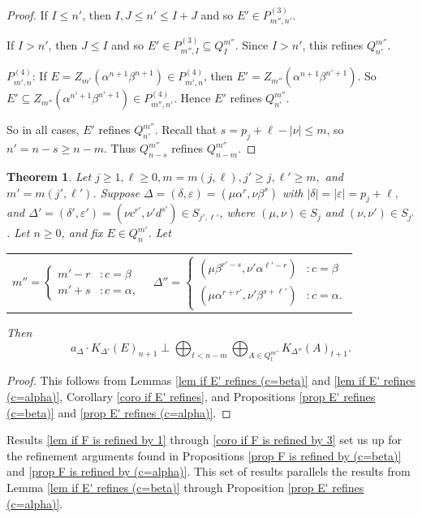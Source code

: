 \documentclass[12pt]{amsart}
\newcommand{\sse}{\subseteq}
\newcommand{\al}{\alpha}
\newcommand{\be}{\beta}
\newcommand{\de}{\delta}
\newcommand{\De}{\Delta}
\newcommand{\ep}{\varepsilon}
\theoremstyle{plain} %
\newtheorem{Theorem}{Theorem}[section]
\theoremstyle{definition} %
\begin{document}
\begin{proof}
    If $I \leq n'$, then $I, J \leq n' \leq I+J$ and so $E' \in P_{m'',n'}^{(3)}$.

    If $I > n'$, then $J \leq I$ and so $E' \in P^{(3)}_{m'',I} \sse Q_I^{m''}$. Since $I > n'$, this refines $Q_{n'}^{m''}$.

    $P^{(4)}_{m',n}$: If $E = Z_{m'}(\al^{n+1}\be^{n+1})\in P_{m',n}^{(4)}$, then $E' = Z_{m''}(\al^{n+1} \be^{n'+1})$. So $E' \sse Z_{m''}(\al^{n'+1}\be^{n'+1}) \in P_{m'',n'}^{(4)}$. Hence $E'$ refines $Q_{n'}^{m''}$.

    So in all cases, $E'$ refines $Q_{n'}^{m''}$. Recall that $s = p_j + \ell - |\nu| \leq m$, so $n'= n-s \geq n-m$. Thus $Q_{n-s}^{m''}$ refines $Q_{n-m}^{m''}$.
\end{proof}

\begin{Theorem}\label{thm a acts on K 2}
Let $j \geq 1, \ell \geq 0, m = m(j,\ell), j' \geq j, \ell' \ge m,$ and $m' = m(j', \ell')$. Suppose $\De = (\de, \ep) = (\mu\al^r, \nu\be^s) $ with $|\de| = |\ep| = p_j + \ell,$ and $\De' =(\de', \ep') = (\nu c^{r'}, \nu'd^{s'}) \in S_{j', \ell'}$, where $(\mu,\nu) \in S_j$ and $(\nu,\nu') \in S_{j'}$. Let $n \geq 0$, and fix $E \in Q_n^{m'}$. Let

    \begin{tabular}{l l}
    $m'' = \begin{cases}
        m'-r &: c=\be\\m'+s &: c=\al,
    \end{cases}$
    & $\De'' = \begin{cases}
        (\mu \be^{r'-s}, \nu'\al^{\ell'-r}) &: c=\be\\ (\mu\al^{r+r'}, \nu'\be^{s+\ell'}) &: c=\al.
    \end{cases}$\\
\end{tabular}

Then \[ a_{\De} \cdot K_{\De'}(E)_{n+1} \perp \bigoplus_{t < n-m} \bigoplus_{A \in Q_{t}^{m''}} K_{\De''}(A)_{t+1}.\]
\end{Theorem}
\begin{proof}
    This follows from Lemmas \ref{lem if E' refines (c=beta)} and \ref{lem if E' refines (c=alpha)}, Corollary \ref{coro if E' refines}, and Propositions \ref{prop E' refines (c=beta)} and \ref{prop E' refines (c=alpha)}.
\end{proof}

Results \ref{lem if F is refined by 1} through \ref{coro if F is refined by 3} set us up for the refinement arguments found in Propositions \ref{prop F is refined by (c=beta)} and \ref{prop F is refined by (c=alpha)}. This set of results parallels the results from Lemma \ref{lem if E' refines (c=beta)} through Proposition \ref{prop E' refines (c=alpha)}.
\end{document}
